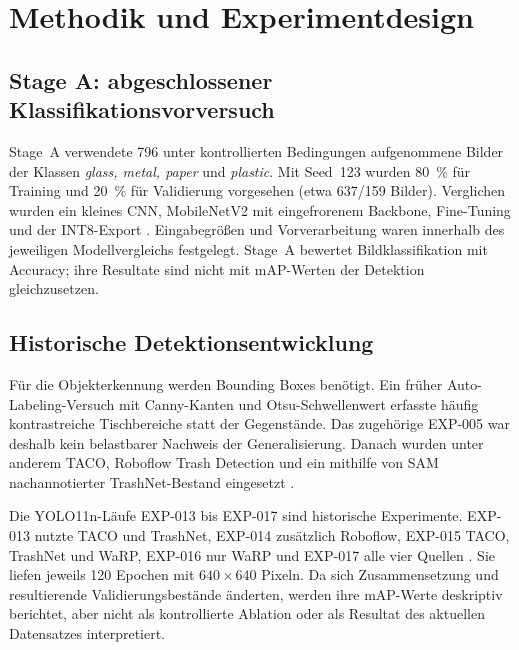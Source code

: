 \section{Methodik und Experimentdesign}

\subsection{Stage A: abgeschlossener Klassifikationsvorversuch}
Stage~A verwendete 796 unter kontrollierten Bedingungen aufgenommene Bilder der Klassen \textit{glass, metal, paper} und \textit{plastic}. Mit Seed~123 wurden \SI{80}{\percent} für Training und \SI{20}{\percent} für Validierung vorgesehen (etwa 637/159 Bilder). Verglichen wurden ein kleines CNN, MobileNetV2 mit eingefrorenem Backbone, Fine-Tuning und der INT8-Export \cite{sandler2018mobilenetv2,tensorflow2024transfer}. Eingabegrößen und Vorverarbeitung waren innerhalb des jeweiligen Modellvergleichs festgelegt. Stage~A bewertet Bildklassifikation mit Accuracy; ihre Resultate sind nicht mit mAP-Werten der Detektion gleichzusetzen.

\subsection{Historische Detektionsentwicklung}
\label{sec:method-gigo}
Für die Objekterkennung werden Bounding Boxes benötigt. Ein früher Auto-Labeling-Versuch mit Canny-Kanten und Otsu-Schwellenwert erfasste häufig kontrastreiche Tischbereiche statt der Gegenstände. Das zugehörige EXP-005 war deshalb kein belastbarer Nachweis der Generalisierung. Danach wurden unter anderem TACO, Roboflow Trash Detection und ein mithilfe von SAM nachannotierter TrashNet-Bestand eingesetzt \cite{proenca2020taco,roboflow2023trash,yang2016classification,kirillov2023segment}.

Die YOLO11n-Läufe EXP-013 bis EXP-017 sind historische Experimente. EXP-013 nutzte TACO und TrashNet, EXP-014 zusätzlich Roboflow, EXP-015 TACO, TrashNet und WaRP, EXP-016 nur WaRP und EXP-017 alle vier Quellen \cite{warp2024dataset,ultralyticsyolov8}. Sie liefen jeweils 120 Epochen mit $640\times640$ Pixeln. Da sich Zusammensetzung und resultierende Validierungsbestände änderten, werden ihre mAP-Werte deskriptiv berichtet, aber nicht als kontrollierte Ablation oder als Resultat des aktuellen Datensatzes interpretiert.

